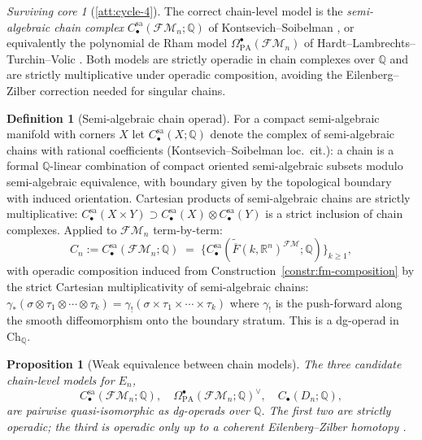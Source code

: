 \documentclass[11pt]{article}
\newtheorem{proposition}[theorem]{Proposition}
\theoremstyle{definition}
\newtheorem{definition}[theorem]{Definition}
\theoremstyle{remark}
\newtheorem{survivor}[theorem]{Surviving core}
\newcommand{\FMbar}{\overline{F}}
\newcommand{\FM}{\mathcal{FM}}
\newcommand{\Ddisk}{D}
\begin{document}
\begin{survivor}[\ref{att:cycle-4}]
The correct chain-level model is the
\emph{semi-algebraic chain complex}
$C^{\mathrm{sa}}_\bullet(\FM_n; \mathbb{Q})$ of Kontsevich--Soibelman
\cite[KS 2000, \S 3]{KontsevichSoibelman2000-deformations},
or equivalently the polynomial de Rham model
$\Omega^\bullet_{\mathrm{PA}}(\FM_n)$ of Hardt--Lambrechts--Turchin--Volic
\cite[HLTV 2011]{HLTV2011}. Both models are strictly operadic in chain
complexes over $\mathbb{Q}$ and are strictly multiplicative under
operadic composition, avoiding the Eilenberg--Zilber correction needed
for singular chains.
\end{survivor}

\begin{definition}[Semi-algebraic chain operad]
\label{def:sa-chain-op}
For a compact semi-algebraic manifold with corners $X$ let
$C^{\mathrm{sa}}_\bullet(X; \mathbb{Q})$ denote the complex of
semi-algebraic chains with rational coefficients (Kontsevich--Soibelman
loc.~cit.): a chain is a formal $\mathbb{Q}$-linear combination of
compact oriented semi-algebraic subsets modulo semi-algebraic
equivalence, with boundary given by the topological boundary with
induced orientation. Cartesian products of semi-algebraic chains are
strictly multiplicative: $C^{\mathrm{sa}}_\bullet(X \times Y)
\supset C^{\mathrm{sa}}_\bullet(X) \otimes C^{\mathrm{sa}}_\bullet(Y)$
is a strict inclusion of chain complexes. Applied to
$\FM_n$ term-by-term:
\[
 C_n := C^{\mathrm{sa}}_\bullet(\FM_n; \mathbb{Q})
 \;=\; \{C^{\mathrm{sa}}_\bullet(\widetilde{\FMbar}(k, \mathbb{R}^n)^{\FM}; \mathbb{Q})\}_{k \geq 1},
\]
with operadic composition induced from Construction~\ref{constr:fm-composition}
by the strict Cartesian multiplicativity of semi-algebraic chains:
$\gamma_*(\sigma \otimes \tau_1 \otimes \cdots \otimes \tau_k) =
 \gamma_!(\sigma \times \tau_1 \times \cdots \times \tau_k)$
where $\gamma_!$ is the push-forward along the smooth diffeomorphism onto
the boundary stratum. This is a dg-operad in $\mathrm{Ch}_\mathbb{Q}$.
\end{definition}

\begin{proposition}[Weak equivalence between chain models]
\label{prop:chain-models-equivalent}
The three candidate chain-level models for $E_n$,
\[
 C^{\mathrm{sa}}_\bullet(\FM_n; \mathbb{Q}),
 \quad
 \Omega^\bullet_{\mathrm{PA}}(\FM_n; \mathbb{Q})^\vee,
 \quad
 C_\bullet(\Ddisk_n; \mathbb{Q}),
\]
are pairwise quasi-isomorphic as dg-operads over $\mathbb{Q}$. The
first two are strictly operadic; the third is operadic only up to a
coherent Eilenberg--Zilber homotopy
\cite[HLTV 2011 \S 5; Fresse 2017]{HLTV2011, Fresse2017}.
\end{proposition}
\end{document}
